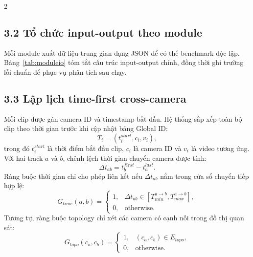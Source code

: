 \documentclass[a4paper, twoside, 10pt]{article}
\begin{document}
\begin{multicols}{2}
\subsection*{3.2 Tổ chức input-output theo module}
Mỗi module xuất dữ liệu trung gian dạng JSON để có thể benchmark độc lập. Bảng~\ref{tab:moduleio} tóm tắt cấu trúc input-output chính, đồng thời ghi trường lỗi chuẩn để phục vụ phân tích sau chạy.

\begin{table}[H]
\centering
\caption{Input-output chính của các module CPose}
\label{tab:moduleio}
\end{table}

\subsection*{3.3 Lập lịch time-first cross-camera}
Mỗi clip được gán camera ID và timestamp bắt đầu. Hệ thống sắp xếp toàn bộ clip theo thời gian trước khi cập nhật bảng Global ID:
\begin{equation}
T_i=(t^{start}_i, c_i, v_i),
\end{equation}
trong đó $t^{start}_i$ là thời điểm bắt đầu clip, $c_i$ là camera ID và $v_i$ là video tương ứng. Với hai track $a$ và $b$, chênh lệch thời gian chuyển camera được tính:
\begin{equation}
\Delta t_{ab}=t^{first}_b-t^{last}_a.
\end{equation}
Ràng buộc thời gian chỉ cho phép liên kết nếu $\Delta t_{ab}$ nằm trong cửa sổ chuyển tiếp hợp lệ:
\begin{equation}
G_{time}(a,b)=
\begin{cases}
1, & \Delta t_{ab}\in[T^{a\rightarrow b}_{min},T^{a\rightarrow b}_{max}],\\
0, & \text{otherwise}.
\end{cases}
\end{equation}
Tương tự, ràng buộc topology chỉ xét các camera có cạnh nối trong đồ thị quan sát:
\begin{equation}
G_{topo}(c_a,c_b)=
\begin{cases}
1, & (c_a,c_b)\in E_{topo},\\
0, & \text{otherwise}.
\end{cases}
\end{equation}


\end{multicols}
\end{document}
